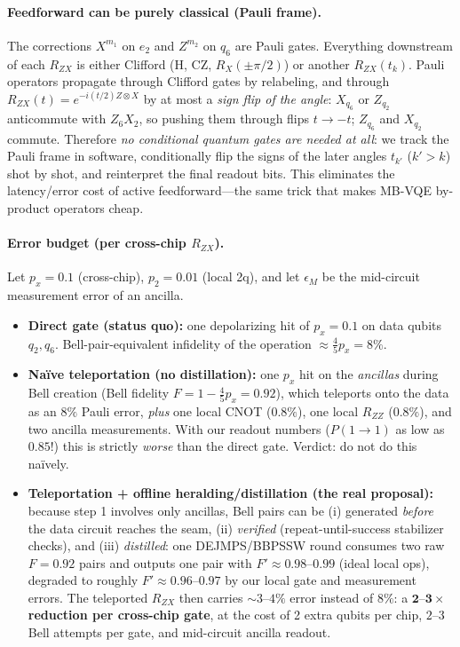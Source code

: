 \documentclass[11pt]{article}
\newcommand{\RZX}{R_{ZX}}
\newcommand{\RZZ}{R_{ZZ}}
\begin{document}
\paragraph{Feedforward can be purely classical (Pauli frame).}
\label{sec:pauliframe}
The corrections $X^{m_1}$ on $e_2$ and $Z^{m_2}$ on $q_6$ are Pauli gates.
Everything downstream of each $\RZX$ is either Clifford (H, CZ,
$R_X(\pm\pi/2)$) or another $\RZX(t_k)$. Pauli operators propagate through
Clifford gates by relabeling, and through
$\RZX(t) = e^{-i(t/2)Z\otimes X}$ by at most a \emph{sign flip of the angle}:
$X_{q_6}$ or $Z_{q_2}$ anticommute with $Z_6 X_2$, so pushing them through
flips $t \to -t$; $Z_{q_6}$ and $X_{q_2}$ commute. Therefore \emph{no
conditional quantum gates are needed at all}: we track the Pauli frame in
software, conditionally flip the signs of the later angles $t_{k'}$
($k' > k$) shot by shot, and reinterpret the final readout bits. This
eliminates the latency/error cost of active feedforward---the same trick that
makes MB-VQE by-product operators cheap.

\paragraph{Error budget (per cross-chip $\RZX$).}
Let $p_x = 0.1$ (cross-chip), $p_2 = 0.01$ (local 2q), and let
$\epsilon_M$ be the mid-circuit measurement error of an ancilla.

\begin{itemize}[leftmargin=2em]
  \item \textbf{Direct gate (status quo):} one depolarizing hit of $p_x = 0.1$
        on data qubits $q_2, q_6$. Bell-pair-equivalent infidelity of the
        operation $\approx \tfrac{4}{5}p_x = 8\%$.
  \item \textbf{Na\"ive teleportation (no distillation):} one $p_x$ hit on
        the \emph{ancillas} during Bell creation
        (Bell fidelity $F = 1 - \tfrac{4}{5}p_x = 0.92$), which teleports onto
        the data as an $8\%$ Pauli error, \emph{plus} one local CNOT
        ($0.8\%$), one local $\RZZ$ ($0.8\%$), and two ancilla measurements.
        With our readout numbers ($P(1\!\to\!1)$ as low as $0.85$!) this is
        strictly \emph{worse} than the direct gate. Verdict: do not do this
        na\"ively.
  \item \textbf{Teleportation + offline heralding/distillation (the real
        proposal):} because step 1 involves only ancillas, Bell pairs can be
        (i) generated \emph{before} the data circuit reaches the seam,
        (ii) \emph{verified} (repeat-until-success stabilizer checks), and
        (iii) \emph{distilled}: one DEJMPS/BBPSSW round consumes two raw
        $F = 0.92$ pairs and outputs one pair with
        $F' \approx 0.98$--$0.99$ (ideal local ops), degraded to roughly
        $F' \approx 0.96$--$0.97$ by our local gate and measurement errors.
        The teleported $\RZX$ then carries $\sim 3$--$4\%$ error instead of
        $8\%$: a $\mathbf{2\text{--}3\times}$ \textbf{reduction per cross-chip
        gate}, at the cost of 2 extra qubits per chip, $2$--$3$ Bell attempts
        per gate, and mid-circuit ancilla readout.
\end{itemize}
\end{document}
